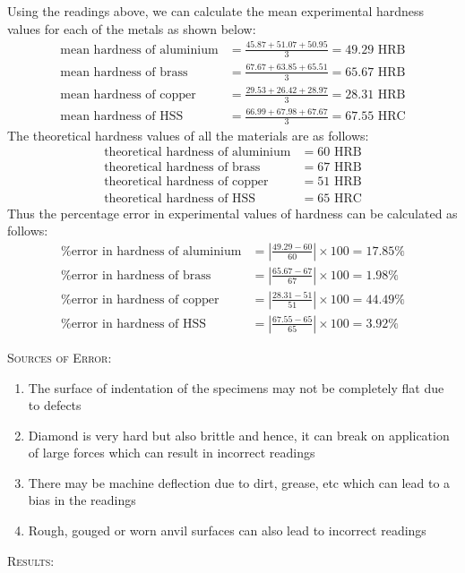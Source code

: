 \documentclass[a4paper, 11pt]{article}
\begin{document}
Using the readings above, we can calculate the mean experimental hardness values for each of the metals as shown below:
\begin{align*}
	\text{mean hardness of aluminium}&=\frac{45.87+51.07+50.95}{3}=49.29\text{ HRB}\\
	\text{mean hardness of brass}&=\frac{67.67+63.85+65.51}{3}=65.67\text{ HRB}\\
	\text{mean hardness of copper}&=\frac{29.53+26.42+28.97}{3}=28.31\text{ HRB}\\
	\text{mean hardness of HSS}&=\frac{66.99+67.98+67.67}{3}=67.55\text{ HRC}
\end{align*}
The theoretical hardness values of all the materials are as follows:
\begin{align*}
	\text{theoretical hardness of aluminium}&=60\text{ HRB}\\
	\text{theoretical hardness of brass}&=67\text{ HRB}\\
	\text{theoretical hardness of copper}&=51\text{ HRB}\\
	\text{theoretical hardness of HSS}&=65\text{ HRC}
\end{align*}
Thus the percentage error in experimental values of hardness can be calculated as follows:
\begin{align*}
	\text{\% error in hardness of aluminium}&=\left|\frac{49.29-60}{60}\right|\times 100=17.85\%\\
	\text{\% error in hardness of brass}&=\left|\frac{65.67-67}{67}\right|\times 100=1.98\%\\
	\text{\% error in hardness of copper}&=\left|\frac{28.31-51}{51}\right|\times 100=44.49\%\\
	\text{\% error in hardness of HSS}&=\left|\frac{67.55-65}{65}\right|\times 100=3.92\%
\end{align*}

\textsc{Sources of Error:}
\begin{enumerate}[label=\roman*)]
	\itemsep0em
	\item The surface of indentation of the specimens may not be completely flat due to defects
	\item Diamond is very hard but also brittle and hence, it can break on application of large forces which can result in incorrect readings
	\item There may be machine deflection due to dirt, grease, etc which can lead to a bias in the readings
	\item Rough, gouged or worn anvil surfaces can also lead to incorrect readings
\end{enumerate}
\newpage
\textsc{Results:} 
\vspace{2mm}
\end{document}
